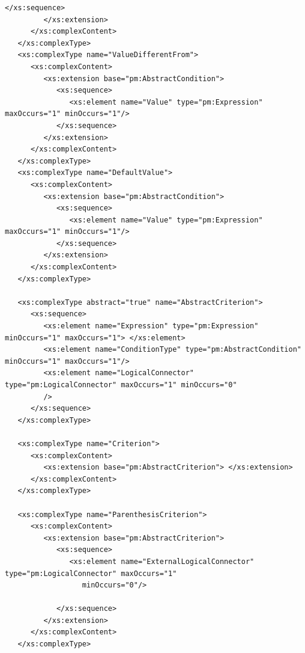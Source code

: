 \documentclass[a4paper,11pt] {ivoa}
\begin{document}
\begin{lstlisting}[style=listXML]
            </xs:sequence>
         </xs:extension>
      </xs:complexContent>
   </xs:complexType>
   <xs:complexType name="ValueDifferentFrom">
      <xs:complexContent>
         <xs:extension base="pm:AbstractCondition">
            <xs:sequence>
               <xs:element name="Value" type="pm:Expression" maxOccurs="1" minOccurs="1"/>
            </xs:sequence>
         </xs:extension>
      </xs:complexContent>
   </xs:complexType>
   <xs:complexType name="DefaultValue">
      <xs:complexContent>
         <xs:extension base="pm:AbstractCondition">
            <xs:sequence>
               <xs:element name="Value" type="pm:Expression" maxOccurs="1" minOccurs="1"/>
            </xs:sequence>
         </xs:extension>
      </xs:complexContent>
   </xs:complexType>

   <xs:complexType abstract="true" name="AbstractCriterion">
      <xs:sequence>
         <xs:element name="Expression" type="pm:Expression" minOccurs="1" maxOccurs="1"> </xs:element>
         <xs:element name="ConditionType" type="pm:AbstractCondition" minOccurs="1" maxOccurs="1"/>
         <xs:element name="LogicalConnector" type="pm:LogicalConnector" maxOccurs="1" minOccurs="0"
         />
      </xs:sequence>
   </xs:complexType>

   <xs:complexType name="Criterion">
      <xs:complexContent>
         <xs:extension base="pm:AbstractCriterion"> </xs:extension>
      </xs:complexContent>
   </xs:complexType>

   <xs:complexType name="ParenthesisCriterion">
      <xs:complexContent>
         <xs:extension base="pm:AbstractCriterion">
            <xs:sequence>
               <xs:element name="ExternalLogicalConnector" type="pm:LogicalConnector" maxOccurs="1"
                  minOccurs="0"/>

            </xs:sequence>
         </xs:extension>
      </xs:complexContent>
   </xs:complexType>


\end{lstlisting}
\end{document}

